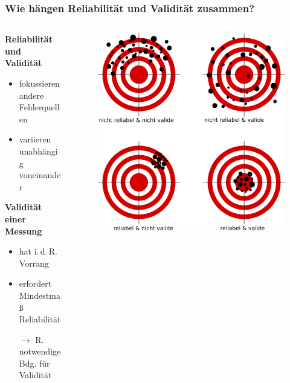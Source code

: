 \documentclass{beamer}
\begin{document}
\begin{frame}
  \frametitle{Wie hängen Reliabilität und Validität zusammen?}
  \begin{columns}
  \begin{column}{.5\textwidth}
    \textbf{Reliabilität und Validität}
    \begin{itemize}
      \footnotesize
      \item fokussieren andere Fehlerquellen
      \item variieren unabhängig voneinander
    \end{itemize}
    \textbf{Validität einer Messung}
    \begin{itemize}
      \footnotesize
      \item hat i.\,d.\,R. Vorrang
      \item erfordert Mindestmaß Reliabilität
      \item [$\rightarrow$] R. notwendige Bdg. für Validität
    \end{itemize}
  \end{column}
  \begin{column}{.5\textwidth}
    \begin{figure}
      \centering
      \includegraphics[scale = .09]{Reliability_and_validity_DE.pdf}
    \end{figure}
  \end{column}
  \end{columns}
\end{frame}
\end{document}
